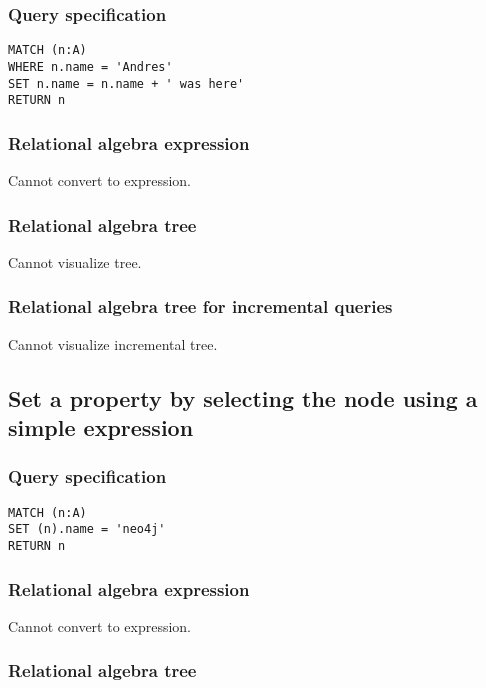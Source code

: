 \subsubsection*{Query specification}

\begin{lstlisting}
MATCH (n:A)
WHERE n.name = 'Andres'
SET n.name = n.name + ' was here'
RETURN n
\end{lstlisting}

\subsubsection*{Relational algebra expression}

Cannot convert to expression.

\subsubsection*{Relational algebra tree}

Cannot visualize tree.

\subsubsection*{Relational algebra tree for incremental queries}

Cannot visualize incremental tree.

\subsection{Set a property by selecting the node using a simple expression}

\subsubsection*{Query specification}

\begin{lstlisting}
MATCH (n:A)
SET (n).name = 'neo4j'
RETURN n
\end{lstlisting}

\subsubsection*{Relational algebra expression}

Cannot convert to expression.

\subsubsection*{Relational algebra tree}

